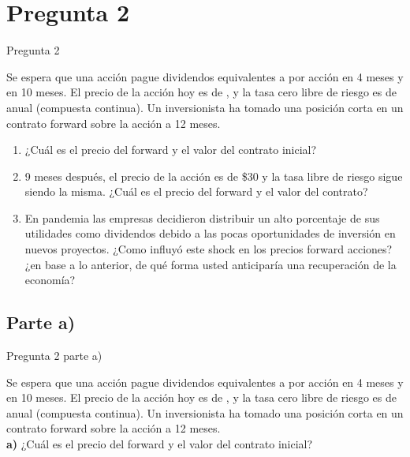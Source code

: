\documentclass{beamer}
\begin{document}
\newcommand{\forward}{\ensuremath{F_0 =  \left(S_0-I \right) \cdot{e^{r \cdot T}}}}
\newcommand{\capcontinuacero}{ F = P \cdot e^{-rT}}



\section{Pregunta 2}

\begin{frame}{Pregunta 2}
  \justify
  \small

  Se espera que una acción pague dividendos equivalentes a \dinero{\dividendos} por acción en 4 meses y en 10 meses.
  El precio de la acción hoy es de \dinero{\precioacc}, y la tasa cero libre de riesgo es de \tlr anual (compuesta continua).
  Un inversionista ha tomado una posición corta en un contrato forward sobre la acción a 12 meses.\\
  \vspace{1em}
  \begin{enumerate}[label=\textbf{\alph*)}]
  \item   ¿Cuál es el precio del forward y el valor del contrato inicial?
  \item   9 meses después, el precio de la acción es de \$30 y la tasa libre de riesgo sigue siendo la misma.
  ¿Cuál es el precio del forward y el valor del contrato?
  \item   En pandemia las empresas decidieron distribuir un alto porcentaje de sus utilidades como dividendos 
  debido a las pocas oportunidades de inversión en nuevos proyectos. ¿Como influyó este shock en los precios 
  forward acciones? ¿en base a lo anterior, de qué forma usted anticiparía una recuperación de la economía?
  \end{enumerate}
\end{frame}

\subsection{Parte a)}

\begin{frame}{Pregunta 2 parte a)}
  \justify

  Se espera que una acción pague dividendos equivalentes a \dinero{\dividendos} por acción en 4 meses y en 10 meses.
  El precio de la acción hoy es de \dinero{\precioacc}, y la tasa cero libre de riesgo es de \tlr anual (compuesta continua).
  Un inversionista ha tomado una posición corta en un contrato forward sobre la acción a 12 meses.\\
  \vspace{1em}
  \textbf{a)} ¿Cuál es el precio del forward y el valor del contrato inicial?  
\end{frame}
\end{document}
